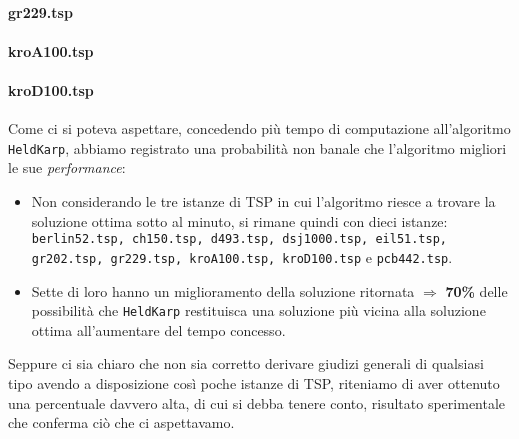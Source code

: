 \paragraph*{gr229.tsp}
\paragraph*{kroA100.tsp}
\paragraph*{kroD100.tsp}
\mbox{}\eqcapo

Come ci si poteva aspettare, concedendo più tempo di computazione all'algoritmo \texttt{HeldKarp}, abbiamo registrato una probabilità non banale che l'algoritmo migliori le sue \emph{performance}: 
\begin{itemize}
	\item Non considerando le tre istanze di TSP in cui l'algoritmo riesce a trovare la soluzione ottima sotto al minuto, si rimane quindi con dieci istanze: \texttt{berlin52.tsp, ch150.tsp, d493.tsp, dsj1000.tsp, eil51.tsp, gr202.tsp, gr229.tsp, kroA100.tsp, kroD100.tsp} e \texttt{pcb442.tsp}.
	\item Sette di loro hanno un miglioramento della soluzione ritornata $\Rightarrow$ \textbf{70\%} delle possibilità che \texttt{HeldKarp} restituisca una soluzione più vicina alla soluzione ottima all'aumentare del tempo concesso.
\end{itemize}
Seppure ci sia chiaro che non sia corretto derivare giudizi generali di qualsiasi tipo avendo a disposizione così poche istanze di TSP, riteniamo di aver ottenuto una percentuale davvero alta, di cui si debba tenere conto, risultato sperimentale che conferma ciò che ci aspettavamo.\acapo

